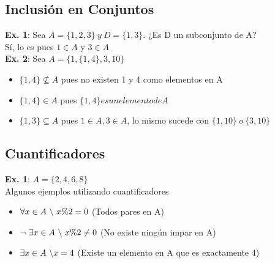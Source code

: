 \documentclass[10pt,a4paper]{article}
\begin{document}
\subsection*{Inclusión en Conjuntos}
\label{subsec:inclusion_conjuntos}
\textbf{Ex. 1}: Sea $A = \{1, 2, 3\} \ y \ D = \{1, 3\}$. ¿Es D un subconjunto de A? \\
Sí, lo es pues $1 \in A$ y $ 3 \in A$ \\
\textbf{Ex. 2}: Sea $A = \{1, \{1, 4\}, 3, 10\}$
\begin{itemize}
    \item $ \{1, 4\} \nsubseteq A $ pues no existen 1 y 4 como elementos en A
    \item $ \{1, 4\} \in A $ pues $\{1, 4\} es un elemento de A$
    \item $\{1, 3\} \subseteq A$ pues $ 1 \in A, 3 \in A$, lo mismo sucede con $ \{1, 10\} \ o \ \{3, 10\}$
\end{itemize}
\subsection*{Cuantificadores}
\label{subsec:cuantificadores}
\textbf{Ex. 1}: $A = \{2, 4, 6, 8\}$ \\
Algunos ejemplos utilizando cuantificadores 
\begin{itemize}
    \item $\forall x \in A \ \symbol{92} \ x \% 2 = 0$ (Todos pares en A)
    \item $\neg \ \exists x \in A \ \symbol{92} \ x \% 2 \neq 0$ (No existe ningún impar en A) 
    \item $ \exists x \in A \ \symbol{92} x = 4$ (Existe un elemento en A que es exactamente 4)
\end{itemize}
\end{document}
